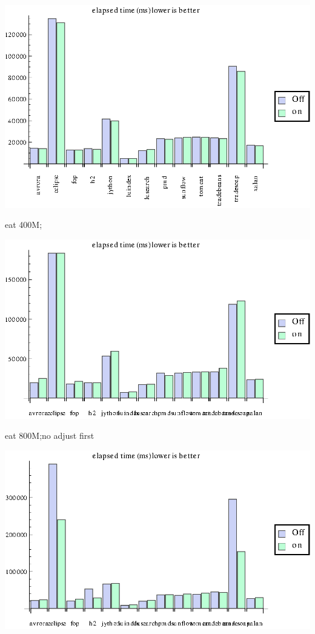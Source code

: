 \documentclass{article}
\begin{document}
\includegraphics{workload_gr3.eps}

eat 400M;

\includegraphics{workload_gr4.eps}

eat 800M;no adjust first

\includegraphics{workload_gr5.eps}
\end{document}
